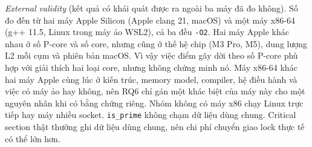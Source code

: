 \emph{External validity} (kết quả có khái quát được ra ngoài ba máy đã đo không). Số đo đến từ hai máy Apple Silicon (Apple clang 21, macOS) và một máy x86-64
(g++ 11.5, Linux trong máy ảo WSL2), cả ba đều \texttt{-O2}. Hai máy Apple khác nhau ở số P-core và số
core, nhưng cũng ở thế hệ chip (M3 Pro, M5), dung lượng L2 mỗi cụm và phiên bản macOS. Vì vậy việc điểm
gãy dời theo số P-core phù hợp với giải thích hai loại core, nhưng không chứng minh nó. Máy x86-64 khác
hai máy Apple cùng lúc ở kiến trúc, memory model, compiler, hệ điều hành và việc có máy ảo hay không, nên
RQ6 chỉ gán một khác biệt của máy này cho một nguyên nhân khi có bằng chứng riêng. Nhóm không có máy x86
chạy Linux trực tiếp hay máy nhiều socket. \texttt{is\_prime} không chạm dữ liệu dùng chung. Critical
section thật thường ghi dữ liệu dùng chung, nên chi phí chuyển giao lock thực tế có thể lớn hơn.
